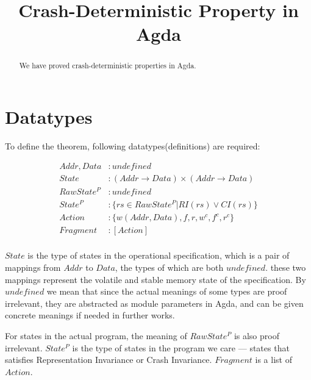 \documentclass[a4paper,11pt]{article}
\theoremstyle{definition}
\begin{document}
\title{Crash-Deterministic Property in Agda}
\maketitle

\begin{abstract}
	We have proved crash-deterministic properties in Agda.
\end{abstract}


\section{Datatypes}

To define the theorem, following datatypes(definitions) are required:

\begin{align*}
	\mathit{Addr}, \mathit{Data} &: \mathit{undefined}\\
	\mathit{State} &: (Addr \to Data) \times (Addr \to Data)\\
	\mathit{RawState^P} &: \mathit{undefined}\\
	\mathit{State^P} &: \{ \mathit{rs} \in \mathit{RawState^P} | \mathit{RI(rs) \lor CI(rs)} \}\\
	\mathit{Action} &: \{w(Addr, Data), f, r, w^c, f^c, r^c\}\\
	\mathit{Fragment} &: [\mathit{Action}]\\
\end{align*}

$\mathit{State}$ is the type of states in the operational specification, which is a pair of mappings from $Addr$ to $Data$, the types of which are both $\mathit{undefined}$. these two mappings represent the volatile and stable memory state of the specification.  By $\mathit{undefined}$ we mean that since the actual meanings of some types are proof irrelevant, they are abstracted as module parameters in Agda, and can be given concrete meanings if needed in further works.

For states in the actual program, the meaning of $\mathit{RawState^P}$ is also proof irrelevant. $\mathit{State^P}$ is the type of states in the program we care \---- states that satisfies Representation Invariance or Crash Invariance. $\mathit{Fragment}$ is a list of $\mathit{Action}$.
\end{document}
